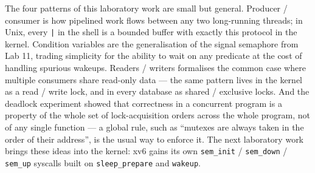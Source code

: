 \documentclass[12pt,a4paper]{article}
\begin{document}
The four patterns of this laboratory work are small but general. Producer / consumer is how pipelined work flows between any two long-running threads; in Unix, every \texttt{|} in the shell is a bounded buffer with exactly this protocol in the kernel. Condition variables are the generalisation of the signal semaphore from Lab 11, trading simplicity for the ability to wait on any predicate at the cost of handling spurious wakeups. Readers / writers formalises the common case where multiple consumers share read-only data --- the same pattern lives in the kernel as a read / write lock, and in every database as shared / exclusive locks. And the deadlock experiment showed that correctness in a concurrent program is a property of the whole set of lock-acquisition orders across the whole program, not of any single function --- a global rule, such as ``mutexes are always taken in the order of their address'', is the usual way to enforce it. The next laboratory work brings these ideas into the kernel: xv6 gains its own \texttt{sem\_init} / \texttt{sem\_down} / \texttt{sem\_up} syscalls built on \texttt{sleep\_prepare} and \texttt{wakeup}.
\end{document}
